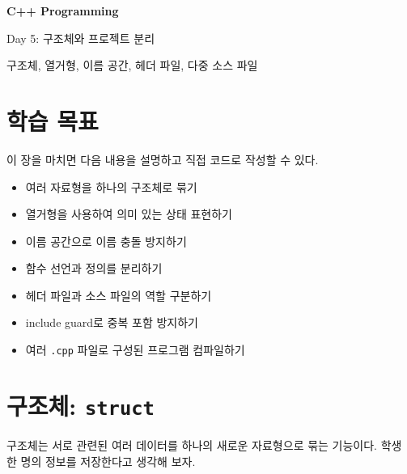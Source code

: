 \documentclass[11pt,a4paper]{article}
\begin{document}
\begin{titlepage}
    \centering
    \vspace*{3cm}

    {\Huge\bfseries C++ Programming\par}
    \vspace{0.8cm}
    {\LARGE Day 5: 구조체와 프로젝트 분리\par}

    \vspace{2cm}

    {\large 구조체, 열거형, 이름 공간, 헤더 파일, 다중 소스 파일\par}

    \vfill
\end{titlepage}

\tableofcontents
\newpage

\section{학습 목표}

\begin{learningbox}
이 장을 마치면 다음 내용을 설명하고 직접 코드로 작성할 수 있다.
\begin{itemize}[leftmargin=1.5em]
    \item 여러 자료형을 하나의 구조체로 묶기
    \item 열거형을 사용하여 의미 있는 상태 표현하기
    \item 이름 공간으로 이름 충돌 방지하기
    \item 함수 선언과 정의를 분리하기
    \item 헤더 파일과 소스 파일의 역할 구분하기
    \item include guard로 중복 포함 방지하기
    \item 여러 \texttt{.cpp} 파일로 구성된 프로그램 컴파일하기
\end{itemize}
\end{learningbox}

\section{구조체: \texttt{struct}}

구조체는 서로 관련된 여러 데이터를 하나의 새로운 자료형으로 묶는 기능이다.
학생 한 명의 정보를 저장한다고 생각해 보자.
\end{document}
